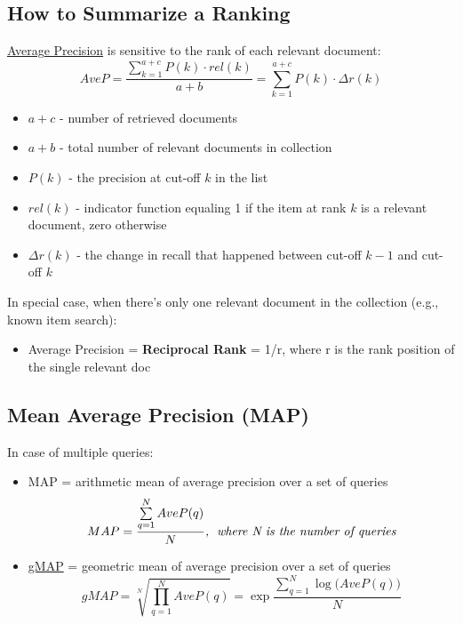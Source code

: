 \subsection{How to Summarize a Ranking}
\href{http://en.wikipedia.org/wiki/Information_retrieval#Average_precision}{Average Precision} is sensitive to the rank of each relevant document:
\begin{equation*}
AveP = \dfrac{\sum\limits_{k=1}^{a+c} P(k) \cdot rel(k)}{a+b} = \sum\limits_{k=1}^{a+c} P(k) \cdot \Delta r(k)
\end{equation*}
\begin{itemize}
\item $a+c$ - number of retrieved documents
\item $a+b$ - total number of relevant documents in collection
\item $P(k)$ - the precision at cut-off $k$ in the list
\item $rel(k)$ - indicator function equaling 1 if the item at rank $k$ is a relevant document, zero otherwise
\item $\Delta r(k)$ - the change in recall that happened between cut-off $k-1$ and cut-off $k$
\end{itemize}

In special case, when there’s only one relevant document in the collection (e.g., known item search): 
\begin{itemize}
\item Average Precision = \textbf{Reciprocal Rank} = 1/r, where r is the rank position of the single relevant doc
\end{itemize}

\subsection{Mean Average Precision (MAP)}
In case of multiple queries:
\begin{itemize}
\item MAP = arithmetic mean of average precision over a set of queries 
\begin{equation*}
MAP = \frac{\sum\limits_{q=1}^{N}AveP(q)}{N}\textit{,\; where N is the number of queries}
\end{equation*}

\item \href{http://trec.nist.gov/pubs/trec15/appendices/CE.MEASURES06.pdf}{gMAP} = geometric mean of average precision over a set of queries
\begin{equation*}
gMAP = \sqrt[N]{\prod_{q=1}^{N}AveP(q)} = \exp \frac{\sum\limits_{q=1}^{N} \log \big(AveP(q)\big)}{N}
\end{equation*}
\end{itemize}

